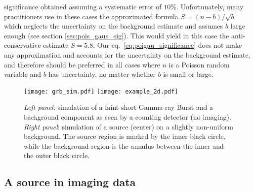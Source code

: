 \documentclass[twocolumn]{aastex61}
\begin{document}
significance obtained assuming a systematic error of $10$\%. Unfortunately, many practitioners use in these cases the approximated formula $S = (n-b) / \sqrt{b}$ which neglects the uncertainty on the background estimate and assumes $b$ large enough (see section \ref{sec:pois_gaus_sig}). This would yield in this case the anti-conservative estimate $S=5.8$. Our eq.~\ref{eq:poigau_significance} does not make any approximation and accounts for the uncertainty on the background estimate, and therefore should be preferred in all cases where $n$ is a Poisson random variable and $b$ has uncertainty, no matter whether $b$ is small or large.

\begin{figure*}[tb]
\centering
\texttt{[image: grb\_sim.pdf]}
\texttt{[image: example\_2d.pdf]}
\caption{\textit{Left panel}: simulation of a faint short Gamma-ray Burst and a background component as seen by a counting detector (no imaging). \textit{Right panel}: simulation of a source (center) on a slightly non-uniform background. The source region is marked by the inner black circle, while the background region is the annulus between the inner and the outer black circle.}
\label{fig:grb_sim}
\end{figure*}

\subsection{A source in imaging data}
\end{document}
